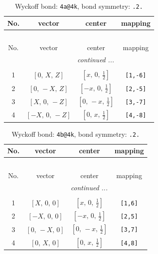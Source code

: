 \documentclass[fleqn,8pt]{jsarticle}
\begin{document}
\begin{longtable}{cccc}
\caption{Wyckoff bond: {\tt 4a@4k}, bond symmetry: {\tt .2.}}
 \\
 \hline \hline
No. & vector & center & mapping \\ \hline \endfirsthead

\multicolumn{3}{l}{\tablename\ \thetable{}} \\
 \hline \hline
No. & vector & center & mapping \\ \hline \endhead

 \hline \hline
\multicolumn{3}{r}{\footnotesize\it continued ...} \\ \endfoot

 \hline \hline
\multicolumn{3}{r}{} \\ \endlastfoot

1 & $\left[ 0,\, X,\, Z \right]$ & $\left[ x,\, 0,\, \frac{1}{2} \right]$ & {\tt [1,-6]} \\ \hline
2 & $\left[ 0,\, - X,\, Z \right]$ & $\left[ - x,\, 0,\, \frac{1}{2} \right]$ & {\tt [2,-5]} \\ \hline
3 & $\left[ X,\, 0,\, - Z \right]$ & $\left[ 0,\, - x,\, \frac{1}{2} \right]$ & {\tt [3,-7]} \\ \hline
4 & $\left[ - X,\, 0,\, - Z \right]$ & $\left[ 0,\, x,\, \frac{1}{2} \right]$ & {\tt [4,-8]} \\
\end{longtable}
\renewcommand{\arraystretch}{1.2}
\begin{longtable}{cccc}
\caption{Wyckoff bond: {\tt 4b@4k}, bond symmetry: {\tt .2.}}
 \\
 \hline \hline
No. & vector & center & mapping \\ \hline \endfirsthead

\multicolumn{3}{l}{\tablename\ \thetable{}} \\
 \hline \hline
No. & vector & center & mapping \\ \hline \endhead

 \hline \hline
\multicolumn{3}{r}{\footnotesize\it continued ...} \\ \endfoot

 \hline \hline
\multicolumn{3}{r}{} \\ \endlastfoot

1 & $\left[ X,\, 0,\, 0 \right]$ & $\left[ x,\, 0,\, \frac{1}{2} \right]$ & {\tt [1,6]} \\ \hline
2 & $\left[ - X,\, 0,\, 0 \right]$ & $\left[ - x,\, 0,\, \frac{1}{2} \right]$ & {\tt [2,5]} \\ \hline
3 & $\left[ 0,\, - X,\, 0 \right]$ & $\left[ 0,\, - x,\, \frac{1}{2} \right]$ & {\tt [3,7]} \\ \hline
4 & $\left[ 0,\, X,\, 0 \right]$ & $\left[ 0,\, x,\, \frac{1}{2} \right]$ & {\tt [4,8]} \\
\end{longtable}
\end{document}
